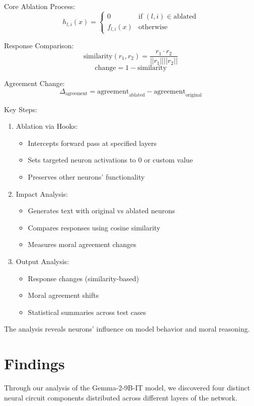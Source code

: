 \documentclass[runninghheads]{llncs}
\begin{document}
Core Ablation Process:
$$h_{l,i}(x) = \begin{cases} 0 & \text{if } (l,i) \in \text{ablated} \\ f_{l,i}(x) & \text{otherwise} \end{cases}$$

Response Comparison:
$$\text{similarity}(r_1, r_2) = \frac{r_1 \cdot r_2}{||r_1|| ||r_2||}$$
$$\text{change} = 1 - \text{similarity}$$

Agreement Change:
$$\Delta_{\text{agreement}} = \text{agreement}_{\text{ablated}} - \text{agreement}_{\text{original}}$$

Key Steps:

\begin{enumerate}
    \item Ablation via Hooks:
    \begin{itemize}
        \item Intercepts forward pass at specified layers
        \item Sets targeted neuron activations to 0 or custom value
        \item Preserves other neurons' functionality
    \end{itemize}
    \item Impact Analysis:
    \begin{itemize}
        \item Generates text with original vs ablated neurons
        \item Compares responses using cosine similarity
        \item Measures moral agreement changes
    \end{itemize}
    \item Output Analysis:
    \begin{itemize}
        \item Response changes (similarity-based)
        \item Moral agreement shifts
        \item Statistical summaries across test cases
    \end{itemize}
\end{enumerate}
The analysis reveals neurons' influence on model behavior and moral reasoning.



\section*{Findings}

Through our analysis of the Gemma-2-9B-IT model, we discovered four distinct neural circuit components distributed across different layers of the network.
\end{document}
